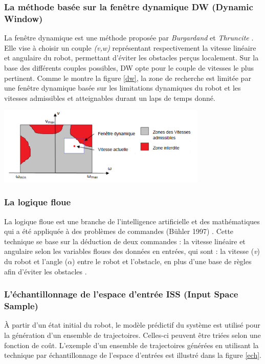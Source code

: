 \subsubsection{La méthode basée sur la fenêtre dynamique DW (Dynamic Window) \cite{Sara}}
La fenêtre dynamique est une méthode proposée par \textit{Burgardand} et \textit{Thruncite} \cite{window}. Elle vise à choisir un couple \textit{(v,w)} représentant respectivement la vitesse linéaire et angulaire du robot, permettant d’éviter les obstacles perçus localement. Sur la base des différents couples possibles, DW opte pour le couple de vitesses le plus pertinent. Comme le montre la figure \ref{dw}, la zone de recherche est limitée par une fenêtre dynamique basée sur les limitations dynamiques du robot et les vitesses admissibles et atteignables durant un laps de temps donné.
\begin{center}	  
	\includegraphics[width=0.75\textwidth]{../Figures/DW.png}%
	\vspace{-0.1 cm}
	\label{dw}%
\end{center}
		
\subsubsection{La logique floue}
La logique floue est une branche de l’intelligence artificielle et des mathématiques qui a été appliquée à des problèmes de commandes (Bühler 1997) \cite{FuzzyLogic}. Cette technique se base sur la déduction de deux commandes : la vitesse linéaire et angulaire selon les variables floues des données en entrées, qui sont : la vitesse (\textit{v}) du robot et l’angle ($\alpha$) entre le robot et l’obstacle, en plus d’une base de règles afin d’éviter les obstacles \cite{Cai2013}.
		
		
\subsubsection{L'échantillonnage de l'espace d'entrée ISS (Input Space Sample) }
À partir d'un état initial du robot, le modèle prédictif du système est utilisé pour la génération d'un ensemble de trajectoires. Celles-ci peuvent être triées selon une fonction de coût. L'exemple d'un ensemble de trajectoires générées en utilisant la technique par échantillonnage de l'espace d'entrées est illustré dans la figure \ref{ech}.

